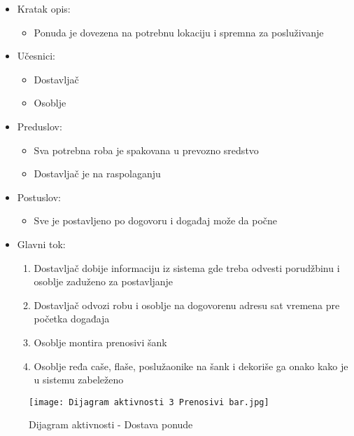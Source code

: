 \documentclass[a4paper]{article}
\begin{document}
\begin{itemize}
    \item Kratak opis:
        \begin{itemize}
            \item Ponuda je dovezena na potrebnu lokaciju i spremna za posluživanje
        \end{itemize}
    \item Učesnici:
        \begin{itemize}
            \item Dostavljač
            \item Osoblje
        \end{itemize}
    \item Preduslov:
        \begin{itemize}
            \item Sva potrebna roba je spakovana u prevozno sredstvo
		    \item Dostavljač je na raspolaganju	
        \end{itemize}
    \item Postuslov:
        \begin{itemize}
            \item Sve je postavljeno po dogovoru i događaj može da počne
        \end{itemize}
    \item Glavni tok:
        \begin{enumerate}
            \item Dostavljač dobije informaciju iz sistema gde treba odvesti porudžbinu i osoblje zaduženo za postavljanje
           \item Dostavljač odvozi robu i osoblje na dogovorenu adresu sat vremena pre početka događaja 
		    \item Osoblje montira prenosivi šank  
		    \item Osoblje ređa caše, flaše, poslužaonike na šank i dekoriše ga onako kako je u sistemu zabeleženo
		    
        \end{enumerate}
    
\end{itemize}

\begin{figure}[H]
    \centering
    \texttt{[image: Dijagram aktivnosti 3 Prenosivi bar.jpg]}
    \caption{Dijagram aktivnosti - Dostava ponude}
    \label{fig:PrenosiviBar}
\end{figure}
\end{document}
